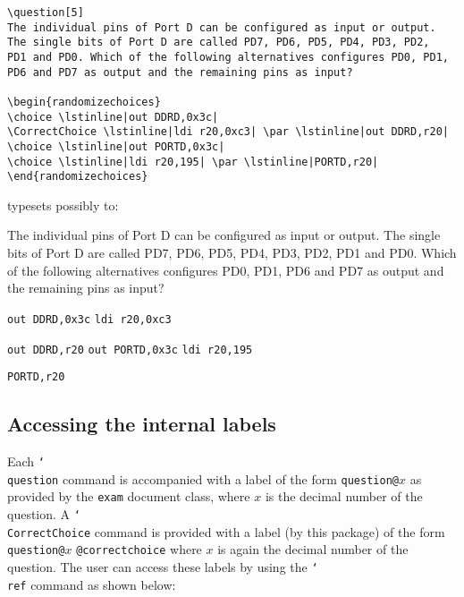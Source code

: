 \documentclass[12pt,a4paper]{exam}
\providecommand{\texorpdfstring}[2]{#1}
\newcommand{\bs}{\texorpdfstring{\char`\\}{}}
\begin{document}
\begin{lstlisting}
\question[5]
The individual pins of Port D can be configured as input or output.
The single bits of Port D are called PD7, PD6, PD5, PD4, PD3, PD2,
PD1 and PD0. Which of the following alternatives configures PD0, PD1,
PD6 and PD7 as output and the remaining pins as input?

\begin{randomizechoices}
\choice \lstinline|out DDRD,0x3c|
\CorrectChoice \lstinline|ldi r20,0xc3| \par \lstinline|out DDRD,r20|
\choice \lstinline|out PORTD,0x3c|
\choice \lstinline|ldi r20,195| \par \lstinline|PORTD,r20|
\end{randomizechoices}
\end{lstlisting}

typesets possibly to:

\begin{questions}
\setlength{\parskip}{0pt}
\setcounter{question}{8}
\question[5]
The individual pins of Port D can be configured as input or output. The single bits
of Port D are called PD7, PD6, PD5, PD4, PD3, PD2, PD1 and PD0. Which of the
following alternatives configures PD0, PD1, PD6 and PD7 as output and the remaining
pins as input?

%

\begin{randomizechoices}[norandomize]
	\choice \lstinline|out DDRD,0x3c|
	\CorrectChoice \lstinline|ldi r20,0xc3| \par \lstinline|out DDRD,r20|
    \choice \lstinline|out PORTD,0x3c|
	\choice \lstinline|ldi r20,195| \par \lstinline|PORTD,r20|
\end{randomizechoices}
\end{questions}

\subsection{Accessing the internal labels}
Each \texttt{\bs question} command is accompanied with a label of the form
\texttt{question@}$x$ as provided by the \texttt{exam} document class, where
$x$ is the decimal number of the question. A \texttt{\bs CorrectChoice}
command is provided with a label (by this package) of the form \linebreak \texttt{question@}$x$%
\texttt{@correctchoice} where $x$ is again the decimal number of the question.
The user can access these labels by using the \texttt{\bs ref} command as shown
below:
\end{document}
